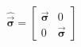 \begin{equation}
\widehat{\overrightarrow{\mathbf{\sigma }}}=\left[ 
\begin{array}{cc}
\overrightarrow{\mathbf{\sigma }} & 0 \\ 
0 & \overrightarrow{\mathbf{\sigma }}
\end{array}
\right]
\end{equation}

